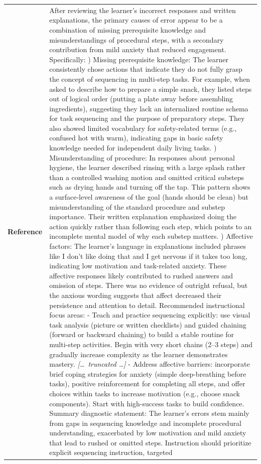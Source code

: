 \begin{longtable}{@{}l p{12.5cm}@{}}
  \textbf{Reference} & After reviewing the learner's incorrect responses and written explanations, the primary causes of error appear to be a combination of missing prerequisite knowledge and misunderstandings of procedural steps, with a secondary contribution from mild anxiety that reduced engagement. Specifically: \newline 1) Missing prerequisite knowledge: The learner consistently chose actions that indicate they do not fully grasp the concept of sequencing in multi-step tasks. For example, when asked to describe how to prepare a simple snack, they listed steps out of logical order (putting a plate away before assembling ingredients), suggesting they lack an internalized routine schema for task sequencing and the purpose of preparatory steps. They also showed limited vocabulary for safety-related terms (e.g., confused hot with warm), indicating gaps in basic safety knowledge needed for independent daily living tasks. \newline 2) Misunderstanding of procedure: In responses about personal hygiene, the learner described rinsing with a large splash rather than a controlled washing motion and omitted critical substeps such as drying hands and turning off the tap. This pattern shows a surface-level awareness of the goal (hands should be clean) but misunderstanding of the standard procedure and substep importance. Their written explanation emphasized doing the action quickly rather than following each step, which points to an incomplete mental model of why each substep matters. \newline 3) Affective factors: The learner's language in explanations included phrases like I don't like doing that and I get nervous if it takes too long, indicating low motivation and task-related anxiety. These affective responses likely contributed to rushed answers and omission of steps. There was no evidence of outright refusal, but the anxious wording suggests that affect decreased their persistence and attention to detail. \newline Recommended instructional focus areas: \newline - Teach and practice sequencing explicitly: use visual task analysis (picture or written checklists) and guided chaining (forward or backward chaining) to build a stable routine for multi-step activities. Begin with very short chains (2--3 steps) and gradually increase complexity as the learner demonstrates mastery. \newline \textit{[\ldots\ truncated \ldots]} \newline - Address affective barriers: incorporate brief coping strategies for anxiety (simple deep-breathing before tasks), positive reinforcement for completing all steps, and offer choices within tasks to increase motivation (e.g., choose snack components). Start with high-success tasks to build confidence. \newline Summary diagnostic statement: The learner's errors stem mainly from gaps in sequencing knowledge and incomplete procedural understanding, exacerbated by low motivation and mild anxiety that lead to rushed or omitted steps. Instruction should prioritize explicit sequencing instruction, targeted 
\end{longtable}
